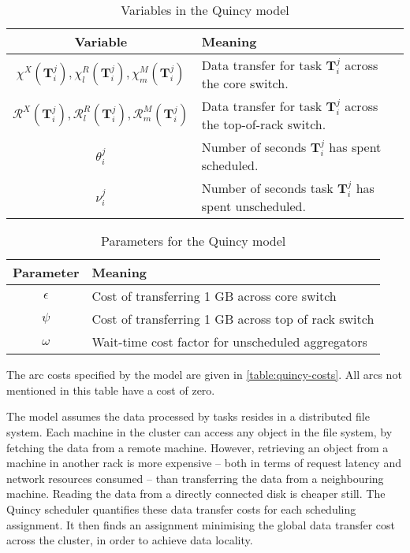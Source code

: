 \begin{table}
    \begin{tabular}{c|l}
        \hline 
        Variable & Meaning\tabularnewline
        \hline 
        $\chi^{X}\left(\mathbf{T}_{i}^{j}\right),\chi_{l}^{R}\left(\mathbf{T}_{i}^{j}\right),\chi_{m}^{M}\left(\mathbf{T}_{i}^{j}\right)$ & Data transfer for task $\mathbf{T}_{i}^{j}$ across the core switch.\tabularnewline %
        $\mathcal{R}^{X}\left(\mathbf{T}_{i}^{j}\right),\mathcal{R}_{l}^{R}\left(\mathbf{T}_{i}^{j}\right),\mathcal{R}_{m}^{M}\left(\mathbf{T}_{i}^{j}\right)$ & Data transfer for task $\mathbf{T}_{i}^{j}$ across the top-of-rack switch.\tabularnewline
        $\theta_{i}^{j}$ & Number of seconds $\mathbf{T}_{i}^{j}$ has spent scheduled.\tabularnewline
        $\nu_{i}^{j}$ & Number of seconds task $\mathbf{T}_{i}^{j}$ has spent unscheduled.\tabularnewline
        \hline
    \end{tabular}
    \caption{Variables in the Quincy model}
    \label{table:quincy-variables}
\end{table}

\begin{table}
    \begin{tabular}{c|l}
        \hline 
        Parameter & Meaning\tabularnewline
        \hline 
        \hline 
        $\epsilon$ & Cost of transferring 1 GB across core switch\tabularnewline
        \hline 
        $\psi$ & Cost of transferring 1 GB across top of rack switch\tabularnewline
        \hline 
        $\omega$ & Wait-time cost factor for unscheduled aggregators\tabularnewline
        \hline 
    \end{tabular}
    \caption{Parameters for the Quincy model}
    \label{table:quincy-parameters}
\end{table}

The arc costs specified by the model are given in \cref{table:quincy-costs}. All arcs not mentioned in this table have a cost of zero\footnotemark.

The model assumes the data processed by tasks resides in a distributed file system. Each machine in the cluster can access any object in the file system, by fetching the data from a remote machine. However, retrieving an object from a machine in another rack is more expensive -- both in terms of request latency and network resources consumed -- than transferring the data from a neighbouring machine. Reading the data from a directly connected disk is cheaper still. The Quincy scheduler quantifies these data transfer costs for each scheduling assignment. It then finds an assignment minimising the global data transfer cost across the cluster, in order to achieve data locality.

